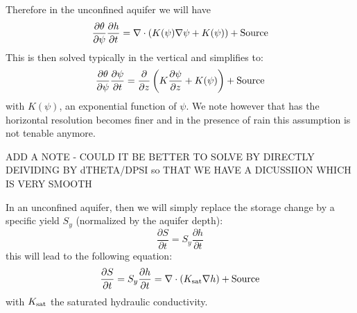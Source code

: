 \documentclass{article}
\begin{document}
Therefore in the unconfined aquifer we will have 
\begin{equation}
     \frac{\partial \theta}{\partial \psi}\frac{\partial h}{\partial t} = \nabla \cdot \left( {K(\psi) \nabla \psi} + K(\psi) \right) + {\rm Source}
\label{Richards_simple_uns}
\end{equation}
This is then solved typically in the vertical and simplifies to:
\begin{equation}
     \frac{\partial \theta}{\partial \psi}\frac{\partial \psi}{\partial t} = \frac{\partial}{\partial z}  \left( {K \frac{\partial \psi}{\partial z} + K(\psi)} \right) + {\rm Source}
\label{Richards_simple_uns_1D}
\end{equation}
with $K(\psi)$, an exponential function of $\psi$.
We note however that has the horizontal resolution becomes finer and in the presence of rain this assumption is not tenable anymore.

ADD A NOTE - COULD IT BE BETTER TO SOLVE BY DIRECTLY DEIVIDING BY dTHETA/DPSI so THAT WE HAVE A DICUSSIION WHICH IS VERY SMOOTH

In an unconfined aquifer, then we will simply replace the storage change by a specific yield $S_y$ (normalized by the aquifer depth):
\begin{equation}
     \frac{\partial S}{\partial t} = S_y \frac{\partial h}{\partial t}  
\end{equation}
this will lead to the following equation:
\begin{equation}
     \frac{\partial S}{\partial t} = S_y \frac{\partial h}{\partial t} = \nabla \cdot \left( {K_{\rm sat} \nabla h} \right) + {\rm Source}
\label{Richards_simple}
\end{equation}
with $K_{\rm sat}$ the saturated hydraulic conductivity. 
\end{document}
